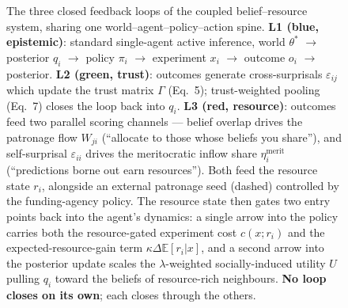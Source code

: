 \documentclass[runningheads]{llncs}
\begin{document}
\begin{figure}[t]
{\begin{tikzpicture}
\end{tikzpicture}%
}%
\caption{The three closed feedback loops of the coupled belief--resource
system, sharing one world--agent--policy--action spine. \textbf{L1
(blue, epistemic)}: standard single-agent active inference, world
$\theta^{*}$ $\to$ posterior $q_i$ $\to$ policy $\pi_i$ $\to$ experiment
$x_i$ $\to$ outcome $o_i$ $\to$ posterior. \textbf{L2 (green, trust)}:
outcomes generate cross-surprisals $\varepsilon_{ij}$ which update the
trust matrix $\Gamma$ (Eq.~5); trust-weighted pooling (Eq.~7) closes the
loop back into $q_i$. \textbf{L3 (red, resource)}: outcomes feed two
parallel scoring channels --- belief overlap drives the patronage flow
$W_{ji}$ (``allocate to those whose beliefs you share''), and
self-surprisal $\varepsilon_{ii}$ drives the meritocratic inflow share
$\eta^{\mathrm{merit}}_i$ (``predictions borne out earn resources'').
Both feed the resource state $r_i$, alongside an external patronage
seed (dashed) controlled by the funding-agency policy. The resource
state then gates two entry points back into the agent's dynamics: a
single arrow into the policy carries both the resource-gated experiment
cost $c(x;r_i)$ and the expected-resource-gain term
$\kappa\Delta\mathbb{E}[r_i|x]$, and a second arrow into the posterior
update scales the $\lambda$-weighted socially-induced utility $U$
pulling $q_i$ toward the beliefs of resource-rich neighbours. \textbf{No
loop closes on its own}; each closes through the others.}
\label{fig:coupled-loop}
\end{figure}
\end{document}
